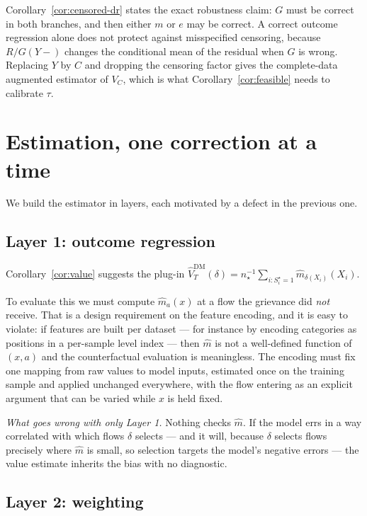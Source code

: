 \documentclass[11pt,a4paper]{article}
\theoremstyle{plain}
\theoremstyle{definition}
\theoremstyle{remark}
\newcommand{\Sstar}{S^{\star}}
\begin{document}
Corollary~\ref{cor:censored-dr} states the exact robustness claim: $G$ must be correct in both
branches, and then either $m$ or $e$ may be correct. A correct outcome regression alone does
not protect against misspecified censoring, because $R/G(Y-)$ changes the conditional mean of
the residual when $G$ is wrong. Replacing $Y$ by $C$ and dropping the censoring factor gives the
complete-data augmented estimator of $V_C$, which is what Corollary~\ref{cor:feasible} needs to
calibrate $\tau$.

\section{Estimation, one correction at a time}\label{sec:est}

We build the estimator in layers, each motivated by a defect in the previous one.

\subsection{Layer 1: outcome regression}\label{sec:layer1}

Corollary~\ref{cor:value} suggests the plug-in
$\hat V^{\text{DM}}_T(\delta)=n_\star^{-1}\sum_{i:\Sstar_i=1}\hat m_{\delta(X_i)}(X_i)$.

To evaluate this we must compute $\hat m_a(x)$ at a flow the grievance did \emph{not} receive.
That is a design requirement on the feature encoding, and it is easy to violate: if features are
built per dataset --- for instance by encoding categories as positions in a per-sample level
index --- then $\hat m$ is not a well-defined function of $(x,a)$ and the counterfactual
evaluation is meaningless. The encoding must fix one mapping from raw values to model inputs,
estimated once on the training sample and applied unchanged everywhere, with the flow entering
as an explicit argument that can be varied while $x$ is held fixed.

\emph{What goes wrong with only Layer 1.} Nothing checks $\hat m$. If the model errs in a way
correlated with which flows $\delta$ selects --- and it will, because $\delta$ selects flows
precisely where $\hat m$ is small, so selection targets the model's negative errors --- the
value estimate inherits the bias with no diagnostic.

\subsection{Layer 2: weighting}
\end{document}
